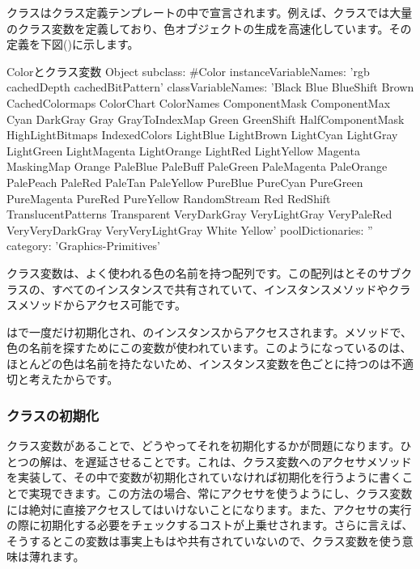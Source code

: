 \documentclass[a4paper,10pt,twoside]{book}
\begin{document}
クラスはクラス定義テンプレートの中で宣言されます。例えば、クラスでは大量のクラス変数を定義しており、色オブジェクトの生成を高速化しています。その定義を下図()に示します。
\begin{classdef}[Color]{Colorとクラス変数}
Object subclass: #Color 	
        instanceVariableNames: 'rgb cachedDepth cachedBitPattern'
        classVariableNames: 'Black Blue BlueShift Brown CachedColormaps ColorChart ColorNames ComponentMask ComponentMax Cyan DarkGray Gray GrayToIndexMap Green GreenShift HalfComponentMask HighLightBitmaps IndexedColors LightBlue LightBrown LightCyan LightGray LightGreen LightMagenta LightOrange LightRed LightYellow Magenta MaskingMap Orange PaleBlue PaleBuff PaleGreen PaleMagenta PaleOrange PalePeach PaleRed PaleTan PaleYellow PureBlue PureCyan PureGreen PureMagenta PureRed PureYellow RandomStream Red RedShift TranslucentPatterns Transparent VeryDarkGray VeryLightGray VeryPaleRed VeryVeryDarkGray VeryVeryLightGray White Yellow'
        poolDictionaries: '' 	
        category: 'Graphics-Primitives'
\end{classdef}

クラス変数は、よく使われる色の名前を持つ配列です。この配列はとそのサブクラスの、すべてのインスタンスで共有されていて、インスタンスメソッドやクラスメソッドからアクセス可能です。%

はで一度だけ初期化され、のインスタンスからアクセスされます。メソッドで、色の名前を探すためにこの変数が使われています。このようになっているのは、ほとんどの色は名前を持たないため、インスタンス変数を色ごとに持つのは不適切と考えたからです。

\subsubsection{クラスの初期化}

クラス変数があることで、どうやってそれを初期化するかが問題になります。ひとつの解は、を遅延させることです。これは、クラス変数へのアクセサメソッドを実装して、その中で変数が初期化されていなければ初期化を行うように書くことで実現できます。この方法の場合、常にアクセサを使うようにし、クラス変数には絶対に直接アクセスしてはいけないことになります。また、アクセサの実行の際に初期化する必要をチェックするコストが上乗せされます。さらに言えば、そうするとこの変数は事実上もはや共有されていないので、クラス変数を使う意味は薄れます。
\end{document}

